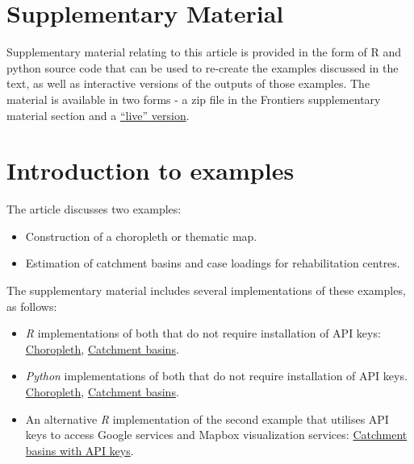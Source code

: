 \documentclass[utf8]{frontiers_suppmat} %
\begin{document}
\onecolumn
{}

\title[Supplementary Material]{{}}


\maketitle


\section{Supplementary Material}

Supplementary material relating to this article is provided in the
form of R and python source code that can be used to re-create the
examples discussed in the text, as well as interactive versions of the
outputs of those examples. The material is available in two forms - a
zip file in the Frontiers supplementary material section and a
\href{https://richardbeare.github.io/Geospatial/index.html}{``live''
  version}.

\section{Introduction to examples}

The article discusses two examples: 
\begin{itemize}
\item Construction of a choropleth or thematic map.
\item Estimation of catchment basins and case loadings for rehabilitation centres.
\end{itemize}

The supplementary material includes several implementations of these examples, as follows:

\begin{itemize}
\item {\em R} implementations of both that do not require installation of API keys: \href{https://richardbeare.github.io/GeospatialStroke/Choropleth/mmc_surrounds.html}{Choropleth}, \href{https://richardbeare.github.io/GeospatialStroke/RehabCatchment/README.html}{Catchment basins}.
\item {\em Python} implementations of both that do not require installation of API keys. \href{https://richardbeare.github.io/GeospatialStroke/python/notebooks/example1.html}{Choropleth}, \href{https://richardbeare.github.io/GeospatialStroke/python/notebooks/example2.html}{Catchment basins}.
\item An alternative {\em R} implementation of the second example that utilises API keys to access Google services and Mapbox visualization services: \href{https://richardbeare.github.io/GeospatialStroke/RehabCatchmentAdvances/Googleway_Mapdeck.html}{Catchment basins with API keys}.
\end{itemize}
\end{document}
